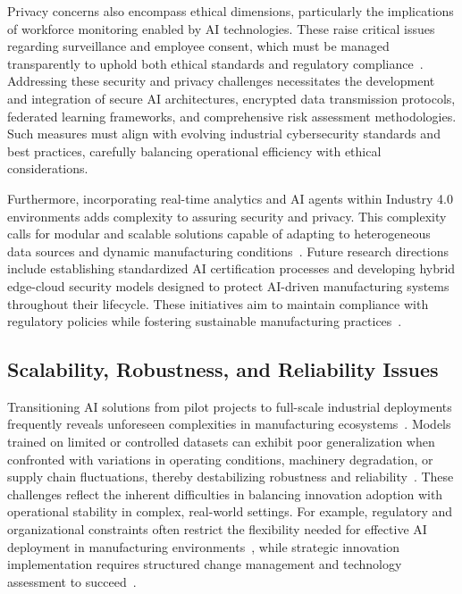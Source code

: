 \documentclass[sigconf]{acmart}
\begin{document}
Privacy concerns also encompass ethical dimensions, particularly the implications of workforce monitoring enabled by AI technologies. These raise critical issues regarding surveillance and employee consent, which must be managed transparently to uphold both ethical standards and regulatory compliance~\cite{ref2}. Addressing these security and privacy challenges necessitates the development and integration of secure AI architectures, encrypted data transmission protocols, federated learning frameworks, and comprehensive risk assessment methodologies. Such measures must align with evolving industrial cybersecurity standards and best practices, carefully balancing operational efficiency with ethical considerations.

Furthermore, incorporating real-time analytics and AI agents within Industry 4.0 environments adds complexity to assuring security and privacy. This complexity calls for modular and scalable solutions capable of adapting to heterogeneous data sources and dynamic manufacturing conditions~\cite{ref37}. Future research directions include establishing standardized AI certification processes and developing hybrid edge-cloud security models designed to protect AI-driven manufacturing systems throughout their lifecycle. These initiatives aim to maintain compliance with regulatory policies while fostering sustainable manufacturing practices~\cite{ref41}.

\subsection{Scalability, Robustness, and Reliability Issues}

Transitioning AI solutions from pilot projects to full-scale industrial deployments frequently reveals unforeseen complexities in manufacturing ecosystems~\cite{ref16,ref19}. Models trained on limited or controlled datasets can exhibit poor generalization when confronted with variations in operating conditions, machinery degradation, or supply chain fluctuations, thereby destabilizing robustness and reliability~\cite{ref6,ref20}. These challenges reflect the inherent difficulties in balancing innovation adoption with operational stability in complex, real-world settings. For example, regulatory and organizational constraints often restrict the flexibility needed for effective AI deployment in manufacturing environments~\cite{ref16}, while strategic innovation implementation requires structured change management and technology assessment to succeed~\cite{ref19}.
\end{document}

